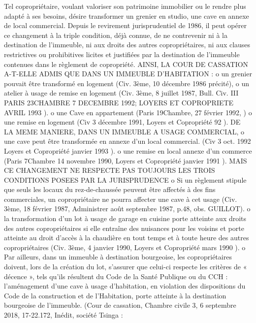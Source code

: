 				Tel copropriétaire, voulant valoriser son patrimoine immobilier ou le rendre plus adapté à ses besoins, désire transformer un grenier en studio, une cave en annexe de local commercial.
				Depuis le revirement jurisprudentiel de 1986, il peut opérer ce changement à la triple condition, déjà connue, de ne contrevenir ni à la destination de l'immeuble, ni aux droits des autres copropriétaires, ni aux clauses restrictives ou prohibitives licites et justifiées par la destination de l'immeuble contenues dans le règlement de copropriété.
				AINSI, LA COUR DE CASSATION A-T-ELLE ADMIS QUE DANS UN IMMEUBLE D'HABITATION :
				o un grenier pouvait être transformé en logement (Civ. 3ème, 10 décembre 1986 précité),
				o un atelier à usage de remise en logement (Civ. 3ème, 8 juillet 1987, Bull. Civ. III  PARIS 23\degres CHAMBRE 7 DECEMBRE 1992; LOYERS ET COPROPRIETE AVRIL 1993 ).
				o une Cave en appartement (Paris 19\degres Chambre, 27 février 1992, )
				o une remise en logement (Civ 3 décembre 1991, Loyers et Copropriété 92 ).
				DE LA MEME MANIERE, DANS UN IMMEUBLE A USAGE COMMERCIAL,
				o une cave peut être transformée en annexe d'un local commercial. (Civ 3 oct. 1992 Loyers et Copropriété janvier 1993 ).
				o une remise en local annexe d'un commerce (Paris 7\degres Chambre 14 novembre 1990, Loyers et Copropriété janvier 1991 ).
				MAIS CE CHANGEMENT NE RESPECTE PAS TOUJOURS LES TROIS CONDITIONS POSEES PAR LA JURISPRUDENCE
				o Si un règlement stipule que seuls les locaux du rez-de-chaussée peuvent être affectés à des fins commerciales, un copropriétaire ne pourra affecter une cave à cet usage (Civ. 3ème, 18 février 1987, Administrer août septembre 1987, p.48, obs. GUILLOT).
				o la transformation d'un lot à usage de garage en cuisine porte atteinte aux droits des autres copropriétaires si elle entraîne des nuisances pour les voisins et porte atteinte au droit d'accès à la chaudière en tout temps et à toute heure des autres copropriétaires (Civ. 3ème, 4 janvier 1990, Loyers et Copropriété mars 1990 ).
				o Par ailleurs, dans un immeuble à destination bourgeoise, les copropriétaires doivent, lors de la création du lot, s’assurer que celui-ci respecte les critères de « décence », tels qu’ils résultent du Code de la Santé Publique ou du CCH : l’aménagement d’une cave à usage d’habitation, en violation des dispositions du Code de la construction et de l’Habitation, porte atteinte à la destination bourgeoise de l’immeuble.
				(Cour de cassation, Chambre civile 3, 6 septembre 2018, 17-22.172, Inédit, société Tsinga :
			
